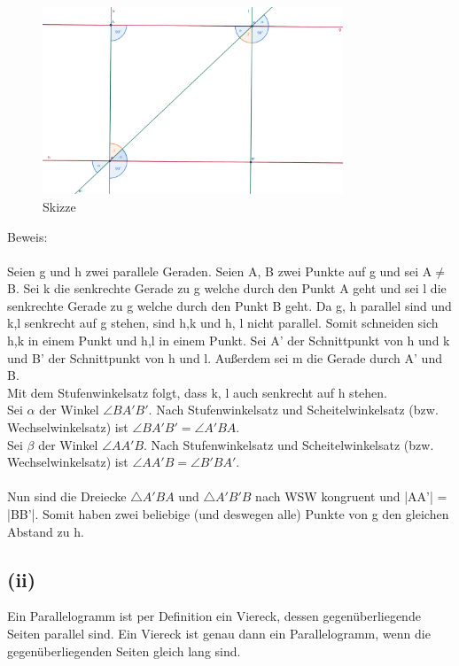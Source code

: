 \documentclass[12pt,a4paper]{article}
\begin{document}
\begin{figure}[htbp]        
    \centering        
    \includegraphics[width=0.8\textwidth]{Blatt_02_Aufgabe_1_i.png}
    \caption{Skizze}
    \label{fig:mein_bild}
\end{figure}
\noindent Beweis: \\
\\
\noindent Seien g und h zwei parallele Geraden. Seien A, B zwei Punkte auf g und sei A$\ne$B. Sei k die senkrechte Gerade zu g welche durch den Punkt A geht und sei l die senkrechte Gerade zu g welche durch den Punkt B geht. Da g, h parallel sind und k,l senkrecht auf g stehen, sind h,k und h, l nicht parallel. Somit schneiden sich h,k in einem Punkt und h,l in einem Punkt. Sei A' der Schnittpunkt von h und k und B' der Schnittpunkt von h und l. Außerdem sei m die Gerade durch A' und B.
\newline \\
Mit dem Stufenwinkelsatz folgt, dass k, l auch senkrecht auf h stehen. 
\newline \\
Sei $\alpha$ der Winkel $\angle BA'B'$. Nach Stufenwinkelsatz und Scheitelwinkelsatz (bzw. Wechselwinkelsatz) ist $\angle BA'B'= \angle A'BA$.\\
Sei $\beta$ der Winkel $\angle AA'B$. Nach Stufenwinkelsatz und Scheitelwinkelsatz (bzw. Wechselwinkelsatz) ist $\angle AA'B = \angle B'BA'$. \\
\\
Nun sind die Dreiecke $\triangle A'BA$ und $\triangle A'B'B$ nach WSW kongruent und |AA'| = |BB'|. Somit haben zwei beliebige (und deswegen alle) Punkte von g den gleichen Abstand zu h.

\newpage
\subsection*{(ii)}
Ein Parallelogramm ist per Definition ein Viereck, dessen gegenüberliegende Seiten parallel sind. Ein Viereck ist genau dann ein Parallelogramm, wenn die gegenüberliegenden Seiten gleich lang sind.
\end{document}
